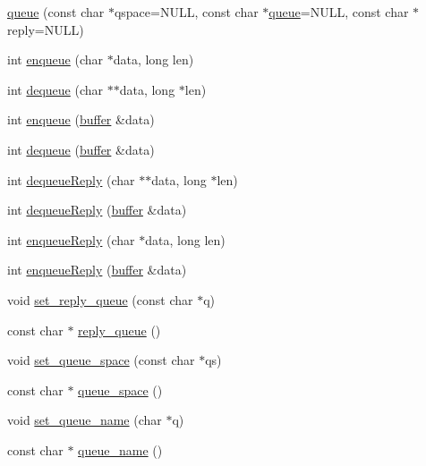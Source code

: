 \begin{DoxyCompactItemize}
\item 
\hyperlink{classatmi_1_1queue_af8c86b01e410fe6499a7f53cdf70eb35}{queue} (const char $\ast$qspace=N\+U\+L\+L, const char $\ast$\hyperlink{classatmi_1_1queue}{queue}=N\+U\+L\+L, const char $\ast$reply=N\+U\+L\+L)
\item 
int \hyperlink{classatmi_1_1queue_a6b27337fd68ca97236e4905d09b7eb15}{enqueue} (char $\ast$data, long len)
\item 
int \hyperlink{classatmi_1_1queue_a140e0faa2ab1265d3258ebc5f2049c41}{dequeue} (char $\ast$$\ast$data, long $\ast$len)
\item 
int \hyperlink{classatmi_1_1queue_a76cf5d92f7d727b0af48698cca6225c5}{enqueue} (\hyperlink{classatmi_1_1buffer}{buffer} \&data)
\item 
int \hyperlink{classatmi_1_1queue_a656e7c4acd4bfefdbecf098907020fad}{dequeue} (\hyperlink{classatmi_1_1buffer}{buffer} \&data)
\item 
int \hyperlink{classatmi_1_1queue_aa8a60e7609a1c28ec346a898a80f8ea6}{dequeue\+Reply} (char $\ast$$\ast$data, long $\ast$len)
\item 
int \hyperlink{classatmi_1_1queue_a1d0741ce63070da00a80cfc69db50797}{dequeue\+Reply} (\hyperlink{classatmi_1_1buffer}{buffer} \&data)
\item 
int \hyperlink{classatmi_1_1queue_a2ea608bb1f59fdccb2b7592381bcf267}{enqueue\+Reply} (char $\ast$data, long len)
\item 
int \hyperlink{classatmi_1_1queue_a2e04e4731abc851e48f6caf77ba61ef2}{enqueue\+Reply} (\hyperlink{classatmi_1_1buffer}{buffer} \&data)
\item 
void \hyperlink{classatmi_1_1queue_a216acfef7e80352c8ce8476825f1146e}{set\+\_\+reply\+\_\+queue} (const char $\ast$q)
\item 
const char $\ast$ \hyperlink{classatmi_1_1queue_ac851146259feb3bf93aed287d6d42cb2}{reply\+\_\+queue} ()
\item 
void \hyperlink{classatmi_1_1queue_a9b8f29fbb2012dda53d6f799ad2110b4}{set\+\_\+queue\+\_\+space} (const char $\ast$qs)
\item 
const char $\ast$ \hyperlink{classatmi_1_1queue_aaf7d8d18008f9ee987b7e7aa2195d1db}{queue\+\_\+space} ()
\item 
void \hyperlink{classatmi_1_1queue_a5d70bbf99076bd41269e2a558bf52475}{set\+\_\+queue\+\_\+name} (char $\ast$q)
\item 
const char $\ast$ \hyperlink{classatmi_1_1queue_adaddc33c75ec6e13f6c57da8d979ad32}{queue\+\_\+name} ()

\end{DoxyCompactItemize}

